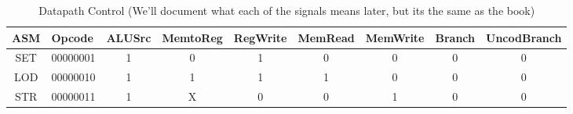 \documentclass[a4paper,14pt]{article}
\begin{document}
\begin{table}[!h]
\centering
\caption*{Datapath Control (We'll document what each of the signals means later, but its the same as the book)}
\begin{tabular}{lllllllll}
ASM & Opcode & ALUSrc & MemtoReg & RegWrite & MemRead & MemWrite & Branch & UncodBranch \\ \hline
\multicolumn{1}{|c|}{SET} & \multicolumn{1}{c|}{00000001} & \multicolumn{1}{c|}{1} & \multicolumn{1}{c|}{0} & \multicolumn{1}{c|}{1} & \multicolumn{1}{c|}{0} & \multicolumn{1}{c|}{0} & \multicolumn{1}{c|}{0} & \multicolumn{1}{c|}{0} \TBstrut \\[1em] \hline
\multicolumn{1}{|c|}{LOD} & \multicolumn{1}{c|}{00000010} & \multicolumn{1}{c|}{1} & \multicolumn{1}{c|}{1} & \multicolumn{1}{c|}{1} & \multicolumn{1}{c|}{1} & \multicolumn{1}{c|}{0} & \multicolumn{1}{c|}{0} & \multicolumn{1}{c|}{0} \TBstrut \\[1em] \hline
\multicolumn{1}{|c|}{STR} & \multicolumn{1}{c|}{00000011} & \multicolumn{1}{c|}{1} & \multicolumn{1}{c|}{X} & \multicolumn{1}{c|}{0} & \multicolumn{1}{c|}{0} & \multicolumn{1}{c|}{1} & \multicolumn{1}{c|}{0} & \multicolumn{1}{c|}{0} \TBstrut \\[1em] \hline


\end{tabular}
\end{table}
\end{document}
